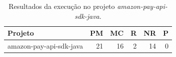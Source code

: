 \begin{table}[ht]
\centering
\caption{Resultados da execução no projeto \textit{amazon-pay-api-sdk-java}.}
\label{tab:amazon-pay-api-sdk-java}
\begin{tabular}{lrrrrr}
\hline
Projeto & PM & MC & R & NR & P \\
\hline
amazon-pay-api-sdk-java & 21 & 16 & 2 & 14 & 0 \\
\hline
\end{tabular}
\end{table}
